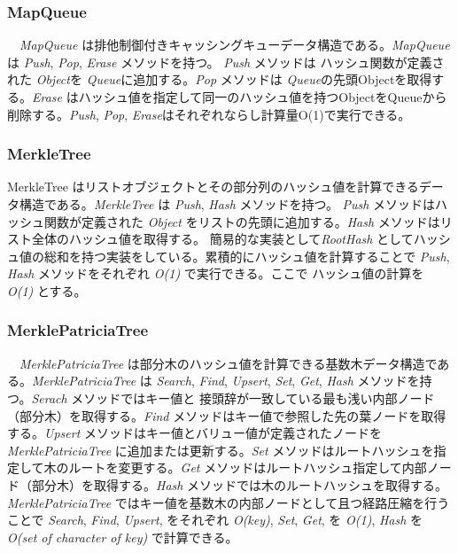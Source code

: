 \hypertarget{mapqueue}{%
\subsubsection{MapQueue}\label{mapqueue}}

　\emph{MapQueue}
は排他制御付きキャッシングキューデータ構造である。\emph{MapQueue} は
\emph{Push}, \emph{Pop}, \emph{Erase} メソッドを持つ。 \emph{Push}
メソッドは ハッシュ関数が定義された \emph{Object}を
\emph{Queue}に追加する。\emph{Pop} メソッドは
\emph{Queue}の先頭Objectを取得する。\emph{Erase}
はハッシュ値を指定して同一のハッシュ値を持つObjectをQueueから削除する。\emph{Push},
\emph{Pop}, \emph{Erase}はそれぞれならし計算量O(1)で実行できる。

\hypertarget{merkletree}{%
\subsubsection{MerkleTree}\label{merkletree}}

MerkleTree
はリストオブジェクトとその部分列のハッシュ値を計算できるデータ構造である。\emph{MerkleTree}
は \emph{Push}, \emph{Hash} メソッドを持つ。 \emph{Push}
メソッドはハッシュ関数が定義された \emph{Object}
をリストの先頭に追加する。\emph{Hash}
メソッドはリスト全体のハッシュ値を取得する。
簡易的な実装として\emph{RootHash}
としてハッシュ値の総和を持つ実装をしている。累積的にハッシュ値を計算することで
\emph{Push}, \emph{Hash} メソッドをそれぞれ \emph{O(1)}
で実行できる。ここで ハッシュ値の計算を \emph{O(1)} とする。

\hypertarget{merklepatriciatree}{%
\subsubsection{MerklePatriciaTree}\label{merklepatriciatree}}

　\emph{MerklePatriciaTree}\cite{4}
は部分木のハッシュ値を計算できる基数木データ構造である。\emph{MerklePatriciaTree}
は \emph{Search}, \emph{Find}, \emph{Upsert}, \emph{Set}, \emph{Get},
\emph{Hash} メソッドを持つ。\emph{Serach} メソッドではキー値と
接頭辞が一致している最も浅い内部ノード（部分木）を取得する。\emph{Find}
メソッドはキー値で参照した先の葉ノードを取得する。\emph{Upsert}
メソッドはキー値とバリュー値が定義されたノードを
\emph{MerklePatriciaTree} に追加または更新する。\emph{Set}
メソッドはルートハッシュを指定して木のルートを変更する。\emph{Get}
メソッドはルートハッシュ指定して内部ノード（部分木）を取得する。\emph{Hash}
メソッドでは木のルートハッシュを取得する。\emph{MerklePatriciaTree}
ではキー値を基数木の内部ノードとして且つ経路圧縮を行うことで
\emph{Search}, \emph{Find}, \emph{Upsert}, をそれぞれ
\emph{O(\textbar key\textbar)}, \emph{Set}, \emph{Get}, を \emph{O(1)},
\emph{Hash} を \emph{O(\textbar set of character of key\textbar)}
で計算できる。

